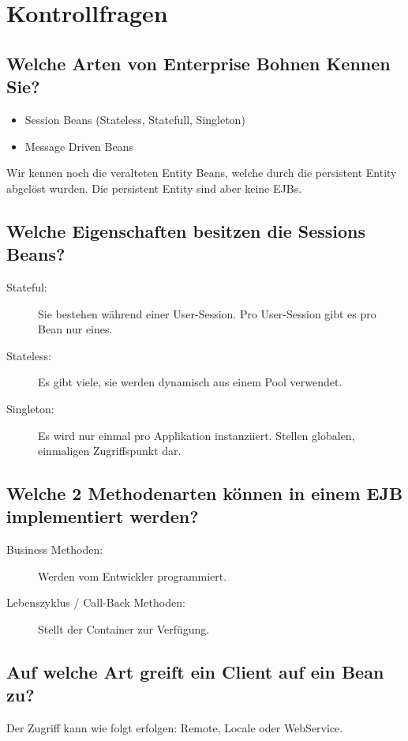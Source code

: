 \section{Kontrollfragen}

\subsection{Welche Arten von Enterprise Bohnen Kennen Sie?}
\begin{itemize}
	\item Session Beans (Stateless, Statefull, Singleton)
	\item Message Driven Beans
\end{itemize}
Wir kennen noch die veralteten Entity Beans, welche durch die persistent Entity abgelöst wurden. Die persistent Entity sind aber keine EJBs.

\subsection{Welche Eigenschaften besitzen die Sessions Beans?}
\begin{description}
	\item[Stateful:] Sie bestehen während einer User-Session. Pro User-Session gibt es pro Bean nur eines.
	\item[Stateless:] Es gibt viele, sie werden dynamisch aus einem Pool verwendet. 
	\item[Singleton:] Es wird nur einmal pro Applikation instanziiert. Stellen globalen, einmaligen Zugriffspunkt dar.
\end{description}

\subsection{Welche 2 Methodenarten können in einem EJB implementiert werden?}
\begin{description}
	\item[Business Methoden:] Werden vom Entwickler programmiert.
	\item[Lebenszyklus / Call-Back Methoden:] Stellt der Container zur Verfügung. 
\end{description}

\subsection{Auf welche Art greift ein Client auf ein Bean zu?}
Der Zugriff kann wie folgt erfolgen: Remote, Locale oder WebService.

